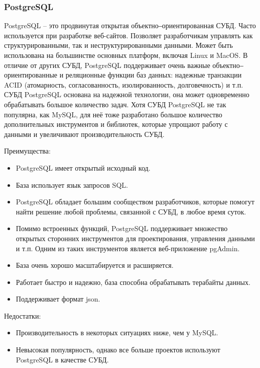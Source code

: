 \documentclass[a4paper,14pt]{extarticle}
\begin{document}
 	\subsubsection{PostgreSQL}
 	
 	PostgreSQL – это продвинутая открытая объектно‒ориентированная СУБД. Часто используется при разработке веб-сайтов. Позволяет разработчикам управлять как структурированными, так и неструктурированными данными. Может быть использована на большинстве основных платформ, включая Linux и MacOS. В отличие от других СУБД, PostgreSQL поддерживает очень важные объектно‒ориентированные и реляционные функции баз данных: надежные транзакции ACID (атомарность, согласованность, изолированность, долговечность) и т.п. СУБД PostgreSQL основана на надежной технологии, она может одновременно обрабатывать большое количество задач. Хотя СУБД PostgreSQL не так популярна, как MySQL, для неё тоже разработано большое количество дополнительных инструментов и библиотек, которые упрощают работу с данными и увеличивают производительность СУБД.
 	
 	Преимущества:
 	
 	\begin{itemize}
 		\item PostgreSQL имеет открытый исходный код.
 		\item База использует язык запросов SQL.
 		\item PostgreSQL обладает большим сообществом разработчиков, которые помогут найти решение любой проблемы, связанной с СУБД, в любое время суток.
 		\item Помимо встроенных функций, PostgreSQL поддерживает множество открытых сторонних инструментов для проектирования, управления данными и т.п. Одним из таких инструментов является веб-приложение pgAdmin.
 		\item База очень хорошо масштабируется и расширяется.
 		\item Работает быстро и надежно, база способна обрабатывать терабайты данных.
 		\item Поддерживает формат json.
 	\end{itemize}
 
 	Недостатки:
 	
 	\begin{itemize}
 		\item Производительность в некоторых ситуациях ниже, чем у MySQL.
 		\item Невысокая популярность, однако все больше проектов используют PostgreSQL в качестве СУБД.
 	\end{itemize}
 
\end{document}
